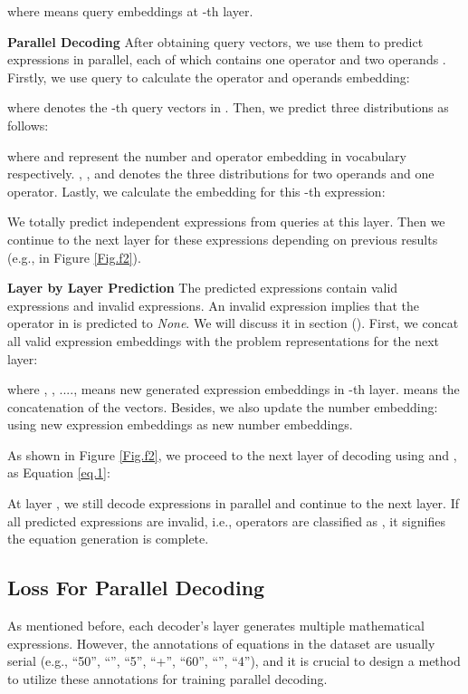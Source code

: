 \documentclass[11pt]{article}
\begin{document}
where  means  query embeddings at -th layer. 

\textbf{Parallel Decoding}
After obtaining  query vectors, we use them to predict  expressions in parallel, each of which contains one operator and two operands . Firstly, we use query to calculate the operator and operands embedding:

where  denotes the -th query vectors in . Then, we predict three distributions as follows:

where  and  represent the number and operator embedding in vocabulary respectively. , , and  denotes the three distributions for two operands and one operator. Lastly, we calculate the embedding for this -th expression:


We totally predict  independent expressions from  queries at this layer. Then we continue to the next layer for these expressions depending on previous results (e.g., in Figure \ref{Fig.f2}).

\textbf{Layer by Layer Prediction} The  predicted expressions contain  valid expressions and  invalid expressions. An invalid expression implies that the operator in  is predicted to \emph{None}. We will discuss it in section (). First, we concat all valid expression embeddings with the problem representations  for the next layer:

where , , ....,  means  new generated expression embeddings in -th layer.  means the concatenation of the vectors. Besides, we also update the number embedding:  using  new expression embeddings as new number embeddings.

As shown in Figure \ref{Fig.f2}, we proceed to the next layer of decoding using  and , as Equation \ref{eq.1}:

At layer , we still decode  expressions in parallel and continue to the next layer. If all predicted expressions are invalid, i.e.,  operators are classified as , it signifies the equation generation is complete.


\subsection{Loss For Parallel Decoding} \label{section3.3}


As mentioned before, each decoder's layer generates multiple mathematical expressions. However, the annotations of equations in the dataset are usually serial (e.g., ``50'', ``'', ``5'', ``+'', ``60'', ``'', ``4''), and it is crucial to design a method to utilize these annotations for training parallel decoding. 
\end{document}
